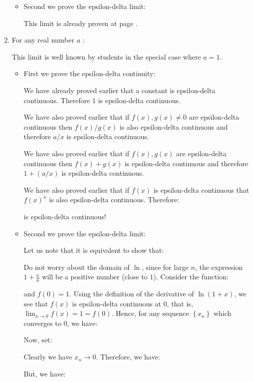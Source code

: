 \begin{enumerate}
\begin{itemize}
			
			\item Second we prove the epsilon-delta limit:
			
			This limit is already proven at page \pageref{Euler number}.
			
		\end{itemize}
		
		\item For any real number $a$ \label{definition exponential function}:
		
		
		This limit is well known by students in the special case where $a=1$.
		
		\begin{itemize}
			\item First we prove the epsilon-delta continuity:
			
			We have already proved earlier that a constant is epsilon-delta continuous. Therefore $1$ is epsilon-delta continuous.
			
			We have also proved earlier that if $f(x),g(x)\neq 0$ are epsilon-delta continuous then $f(x)/g(x)$ is also epsilon-delta continuous and therefore $a/x$ is epsilon-delta continuous.
			
			We have also proved earlier that if $f(x),g(x)$ are epsilon-delta continuous then $f(x)+g(x)$ is epsilon-delta continuous and therefore $1+(a/x)$ is  epsilon-delta continuous.
			
			We have also proved earlier that if $f(x)$ is epsilon-delta continuous that $f(x)^{n}$ is also epsilon-delta continuous. Therefore:
			
			is epsilon-delta continuous!
			
			\item Second we prove the epsilon-delta limit:
			
			 Let us note that it is equivalent to show that:
			
			Do not worry about the domain of $\ln$, since for large $n$, the expression $1+\frac{a}{n}$ will be a positive number (close to $1$). Consider the function:
			
			and $f(0)=1$. Using the definition of the derivative of $\ln(1+x)$, we see that $f(x)$ is epsilon-delta continuous at $0$, that is, $\lim _{x \rightarrow 0} f(x)=1=f(0)$. Hence, for any sequence $\left\{x_n\right\}$ which converges to $0$, we have:
			
			Now, set:
			
			Clearly we have $x_n \rightarrow 0$. Therefore, we have:
			
			But, we have:
			

\end{itemize}
\end{enumerate}
